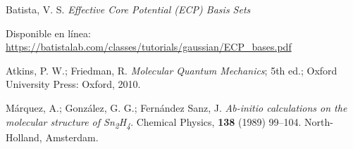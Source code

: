 \documentclass[12pt]{article}
\begin{document}
\begin{thebibliography}{9}
Batista, V. S. \emph{Effective Core Potential (ECP) Basis Sets} 

Disponible en línea: \url{https://batistalab.com/classes/tutorials/gaussian/ECP_bases.pdf} 

Atkins, P. W.; Friedman, R. \emph{Molecular Quantum Mechanics}; 5th ed.; Oxford University Press: Oxford, 2010.

Márquez, A.; González, G. G.; Fernández Sanz, J. \emph{Ab-initio calculations on the molecular structure of Sn\textsubscript{2}H\textsubscript{4}}. Chemical Physics, \textbf{138} (1989) 99–104. North-Holland, Amsterdam.




\end{thebibliography}
\end{document}
